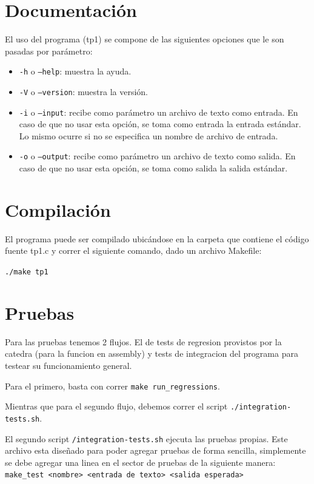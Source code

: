 \documentclass[11pt,a4paper]{article}
\begin{document}
\section{Documentación}
El uso del programa (tp1) se compone de las siguientes opciones que le son pasadas por parámetro:
\begin{itemize}
	\item \texttt{-h} o \texttt{--help}: muestra la ayuda.
	\item \texttt{-V} o \texttt{--version}: muestra la versión.
	\item \texttt{-i} o \texttt{--input}: recibe como parámetro un archivo de texto como entrada. En caso de que no usar esta opción, se toma como entrada la entrada estándar. Lo mismo ocurre si no se especifica un nombre de archivo de entrada.
	\item \texttt{-o} o \texttt{--output}: recibe como parámetro un archivo de texto como salida. En caso de que no usar esta opción, se toma como salida la salida estándar.
\end{itemize}

\section{Compilación}
El programa puede ser compilado ubicándose en la carpeta que contiene el código fuente tp1.c y correr el siguiente comando, dado un archivo Makefile:

\texttt{./make tp1}


\section{Pruebas}
Para las pruebas tenemos 2 flujos. El de tests de regresion provistos por la catedra (para la funcion en assembly) y tests de integracion del programa para testear su funcionamiento general.

Para el primero, basta con correr \texttt{make run\_regressions}.

Mientras que para el segundo flujo, debemos correr el script \texttt{./integration-tests.sh}.

El segundo script \texttt{/integration-tests.sh} ejecuta las pruebas propias.
Este archivo esta diseñado para poder agregar pruebas de forma sencilla, simplemente se debe agregar una linea en el sector de pruebas de la siguiente manera:\\

\texttt{make\_test <nombre> <entrada de texto> <salida esperada>}
\end{document}
